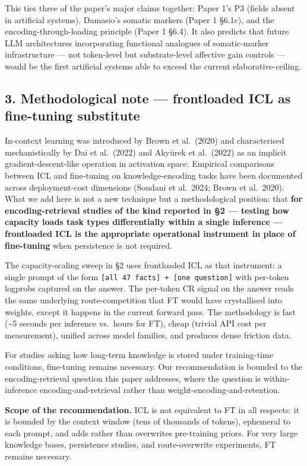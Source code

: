 \documentclass[
]{article}
\begin{document}
This ties three of the paper's major claims together: Paper 1's P3
(fields absent in artificial systems), Damasio's somatic markers (Paper
1 §6.1c), and the encoding-through-loading principle (Paper 1 §6.4). It
also predicts that future LLM architectures incorporating functional
analogues of somatic-marker infrastructure --- not token-level but
substrate-level affective gain controls --- would be the first
artificial systems able to exceed the current elaborative-ceiling.

\subsection{3. Methodological note --- frontloaded ICL as fine-tuning
substitute}\label{methodological-note-frontloaded-icl-as-fine-tuning-substitute}

In-context learning was introduced by Brown et al.~(2020) and
characterised mechanistically by Dai et al.~(2022) and Akyürek et
al.~(2022) as an implicit gradient-descent-like operation in activation
space. Empirical comparisons between ICL and fine-tuning on
knowledge-encoding tasks have been documented across deployment-cost
dimensions (Soudani et al.~2024; Brown et al.~2020). What we add here is
not a new technique but a methodological position: that \textbf{for
encoding-retrieval studies of the kind reported in §2 --- testing how
capacity loads task types differentially within a single inference ---
frontloaded ICL is the appropriate operational instrument in place of
fine-tuning} when persistence is not required.

The capacity-scaling sweep in §2 uses frontloaded ICL as that
instrument: a single prompt of the form
\texttt{{[}all\ 47\ facts{]}\ +\ {[}one\ question{]}} with per-token
logprobs captured on the answer. The per-token CR signal on the answer
reads the same underlying route-competition that FT would have
crystallised into weights, except it happens in the current forward
pass. The methodology is fast (\textasciitilde5 seconds per inference
vs.~hours for FT), cheap (trivial API cost per measurement), unified
across model families, and produces dense friction data.

For studies asking how long-term knowledge is stored under training-time
conditions, fine-tuning remains necessary. Our recommendation is bounded
to the encoding-retrieval question this paper addresses, where the
question is within-inference encoding-and-retrieval rather than
weight-encoding-and-retention.

\textbf{Scope of the recommendation.} ICL is not equivalent to FT in all
respects: it is bounded by the context window (tens of thousands of
tokens), ephemeral to each prompt, and adds rather than overwrites
pre-training priors. For very large knowledge bases, persistence
studies, and route-overwrite experiments, FT remains necessary.
\end{document}
